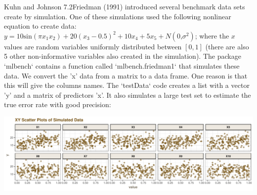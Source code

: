 \documentclass[]{report}
\newenvironment{Shaded}{\begin{snugshade}}{\end{snugshade}}
\newcommand{\KeywordTok}[1]{\textcolor[rgb]{0.13,0.29,0.53}{\textbf{#1}}}
\newcommand{\DataTypeTok}[1]{\textcolor[rgb]{0.13,0.29,0.53}{#1}}
\newcommand{\DecValTok}[1]{\textcolor[rgb]{0.00,0.00,0.81}{#1}}
\newcommand{\StringTok}[1]{\textcolor[rgb]{0.31,0.60,0.02}{#1}}
\newcommand{\OperatorTok}[1]{\textcolor[rgb]{0.81,0.36,0.00}{\textbf{#1}}}
\newcommand{\NormalTok}[1]{#1}
\begin{document}
\begin{question}{Kuhn and Johnson 7.2}Friedman (1991) introduced several benchmark data sets create by simulation. One of these simulations used the following nonlinear equation to create data: $y = 10\text{sin}(\pi x_1 x_2)+20(x_3-0.5)^2+10x_4+5x_5+N(0\text{,} \sigma^2)$; where the $x$ values are random variables uniformly distributed between $[0, 1]$ (there are also 5 other non-informative variables also created in the simulation). 
\newline
The package `mlbench` contains a function called `mlbench.friedman1` that simulates these data. We convert the 'x' data from a matrix to a data frame. One reason is that this will give the columns names. The `testData` code creates a list with a vector 'y' and a matrix of predictors 'x'. It also simulates a large test set to estimate the true error rate with good precision: \end{question}

\begin{Shaded}
\end{Shaded}

\includegraphics{Homework-Two2_files/figure-latex/kj-7.2-ex3-1.pdf}
\end{document}
